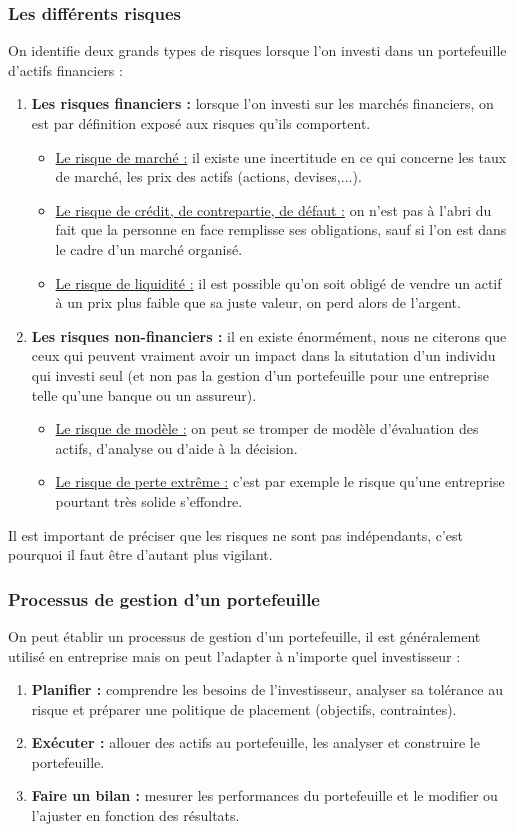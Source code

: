 \subsubsection{Les différents risques}
On identifie deux grands types de risques lorsque l'on investi dans un portefeuille d'actifs financiers :
\begin{enumerate}
 \item \textbf{Les risques financiers :} lorsque l'on investi sur les marchés financiers, on est par définition exposé aux risques qu'ils comportent.
    \begin{itemize}
     \item \underline{Le risque de marché :} il existe une incertitude en ce qui concerne les taux de marché, les prix des actifs (actions, devises,...).
     \item \underline{Le risque de crédit, de contrepartie, de défaut :} on n'est pas à l'abri du fait que la personne en face remplisse ses obligations, sauf si l'on est dans le cadre d'un marché organisé.
     \item \underline{Le risque de liquidité :} il est possible qu'on soit obligé de vendre un actif à un prix plus faible que sa juste valeur, on perd alors de l'argent.
    \end{itemize}
 \item \textbf{Les risques non-financiers :} il en existe énormément, nous ne citerons que ceux qui peuvent vraiment avoir un impact dans la situtation d'un individu qui investi seul (et non pas la gestion d'un portefeuille pour une entreprise telle qu'une banque ou un assureur).
    \begin{itemize}
     \item \underline{Le risque de modèle :} on peut se tromper de modèle d'évaluation des actifs, d'analyse ou d'aide à la décision.
     \item \underline{Le risque de perte extrême :} c'est par exemple le risque qu'une entreprise pourtant très solide s'effondre.
    \end{itemize}
\end{enumerate}
Il est important de préciser que les risques ne sont pas indépendants, c'est pourquoi il faut être d'autant plus vigilant.

\subsubsection{Processus de gestion d'un portefeuille}
On peut établir un processus de gestion d'un portefeuille, il est généralement utilisé en entreprise mais on peut l'adapter à n'importe quel investisseur :
\begin{enumerate}
 \item \textbf{Planifier :} comprendre les besoins de l'investisseur, analyser sa tolérance au risque et préparer une politique de placement (objectifs, contraintes).
 \item \textbf{Exécuter :} allouer des actifs au portefeuille, les analyser et construire le portefeuille.
 \item \textbf{Faire un bilan :} mesurer les performances du portefeuille et le modifier ou l'ajuster en fonction des résultats.
\end{enumerate}

